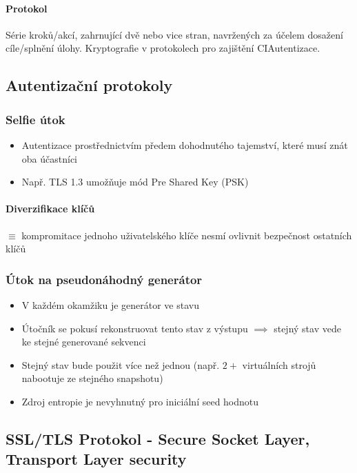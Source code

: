 \documentclass[10pt,a4paper]{article}
\begin{document}
\paragraph*{Protokol} Série kroků/akcí, zahrnující dvě nebo vice stran, navržených za účelem dosažení cíle/splnění úlohy. Kryptografie v protokolech pro zajištění CIAutentizace.

\subsection{Autentizační protokoly}

\subsubsection*{Selfie útok}
\begin{itemize}
    \item Autentizace prostřednictvím předem dohodnutého tajemství, které musí znát oba účastníci 
    \item Např. TLS 1.3 umožňuje mód Pre Shared Key (PSK)
\end{itemize}

\paragraph*{Diverzifikace klíčů} $\equiv$ kompromitace jednoho uživatelského klíče nesmí ovlivnit bezpečnost ostatních klíčů

\subsubsection*{Útok na pseudonáhodný generátor}
\begin{itemize}
    \item V každém okamžiku je generátor ve stavu
    \item Útočník se pokusí rekonstruovat tento stav z výstupu $\implies$ stejný stav vede ke stejné generované sekvenci
    \item Stejný stav bude použit více než jednou (např. $2+$ virtuálních strojů nabootuje ze stejného snapshotu)
    \item Zdroj entropie je nevyhnutný pro iniciální seed hodnotu
\end{itemize}

\subsection{SSL/TLS Protokol -  Secure Socket Layer, Transport Layer security}
\end{document}
